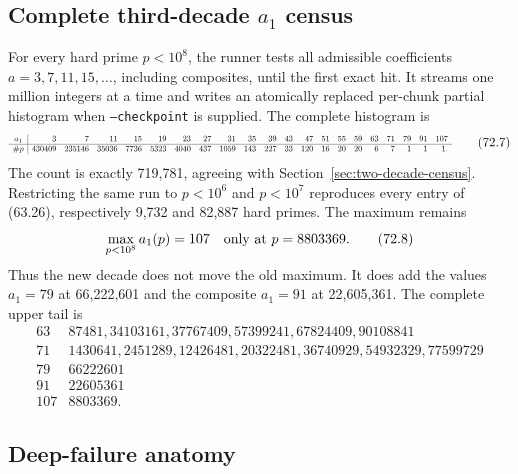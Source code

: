 \documentclass[10pt,reqno]{amsart}
\theoremstyle{definition}
\newcommand{\1}{\mathbf 1}
\begin{document}
\subsection{Complete third-decade $a_1$ census}

For every hard prime $p<10^8$, the runner tests all admissible coefficients
$a=3,7,11,15,\ldots$, including composites, until the first exact hit.  It
streams one million integers at a time and writes an atomically replaced
per-chunk partial histogram when \texttt{--checkpoint} is supplied.  The complete
histogram is
\begin{equation}
\resizebox{\textwidth}{!}{$
\begin{array}{c|rrrrrrrrrrrrrrrrrrrr}
a_1&3&7&11&15&19&23&27&31&35&39&43&47&51&55&59&63&71&79&91&107\\ \hline
\#p&430409&235146&35036&7736&5323&4040&437&1059&143&227&33&120&16&20&20&6&7&1&1&1.
\end{array}
$}                                                          \tag{72.7}
\end{equation}
The count is exactly 719,781, agreeing with Section~\ref{sec:two-decade-census}.  Restricting the same run to
$p<10^6$ and $p<10^7$ reproduces every entry of (63.26), respectively
9,732 and 82,887 hard primes.  The maximum remains
\begin{equation}
                         \max_{p<10^8}a_1(p)=107
                         \quad\hbox{only at }p=8803369.     \tag{72.8}
\end{equation}
Thus the new decade does not move the old maximum.  It does add the values
$a_1=79$ at 66,222,601 and the composite $a_1=91$ at 22,605,361.  The
complete upper tail is
\begin{equation}
\begin{array}{c|l}
63&87481,34103161,37767409,57399241,67824409,90108841\\
71&1430641,2451289,12426481,20322481,36740929,54932329,77599729\\
79&66222601\\91&22605361\\107&8803369.
\end{array}                                                        \tag{72.9}
\end{equation}

\subsection{Deep-failure anatomy}
\end{document}

